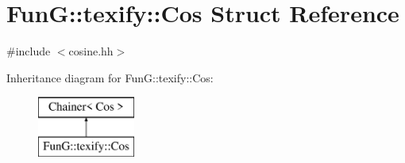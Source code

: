 \hypertarget{structFunG_1_1texify_1_1Cos}{\section{Fun\-G\-:\-:texify\-:\-:Cos Struct Reference}
\label{structFunG_1_1texify_1_1Cos}
}


{\ttfamily \#include $<$cosine.\-hh$>$}

Inheritance diagram for Fun\-G\-:\-:texify\-:\-:Cos\-:\begin{figure}[H]
\begin{center}
\leavevmode
\includegraphics[height=2.000000cm]{structFunG_1_1texify_1_1Cos}
\end{center}
\end{figure}
